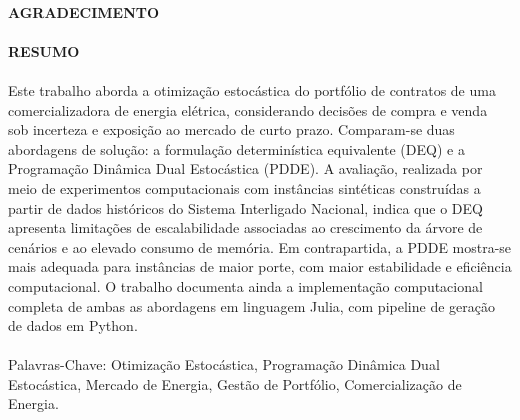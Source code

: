 \paragraph{}%

\pagebreak

\begin{center}
\textbf{AGRADECIMENTO}
\end{center}
      \vspace{0.5cm}

\paragraph{}%

\pagebreak

\begin{center}
\textbf{RESUMO}
\end{center}
      \vspace{0.5cm}

\paragraph{}Este trabalho aborda a otimiza\c{c}\~ao estoc\'astica do portf\'olio de contratos de uma comercializadora de energia el\'etrica, considerando decis\~oes de compra e venda sob incerteza e exposi\c{c}\~ao ao mercado de curto prazo. Comparam-se duas abordagens de solu\c{c}\~ao: a formula\c{c}\~ao determin\'istica equivalente (DEQ) e a Programa\c{c}\~ao Din\^amica Dual Estoc\'astica (PDDE). A avalia\c{c}\~ao, realizada por meio de experimentos computacionais com inst\^ancias sint\'eticas constru\'idas a partir de dados hist\'oricos do Sistema Interligado Nacional, indica que o DEQ apresenta limita\c{c}\~oes de escalabilidade associadas ao crescimento da \'arvore de cen\'arios e ao elevado consumo de mem\'oria. Em contrapartida, a PDDE mostra-se mais adequada para inst\^ancias de maior porte, com maior estabilidade e efici\^encia computacional. O trabalho documenta ainda a implementa\c{c}\~ao computacional completa de ambas as abordagens em linguagem Julia, com pipeline de gera\c{c}\~ao de dados em Python.

\paragraph{}
\noindent Palavras-Chave: Otimiza\c{c}\~ao Estoc\'astica, Programa\c{c}\~ao Din\^amica Dual Estoc\'astica, Mercado de Energia, Gest\~ao de Portf\'olio, Comercializa\c{c}\~ao de Energia.


